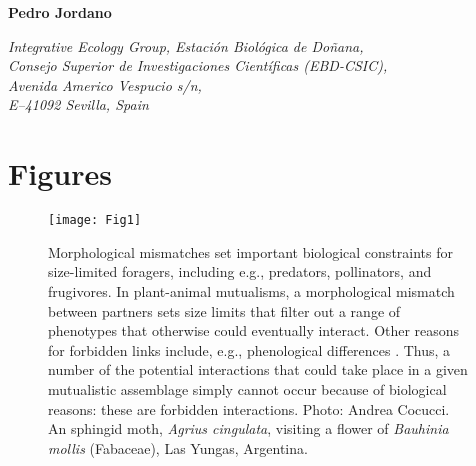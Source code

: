 \documentclass[a4paper,12pt]{article}
\begin{document}
\begin{flushright}
  \noindent 
  		\textbf{Pedro Jordano }\\
  		\begin{spacing}{1.0}
		\textit{Integrative Ecology Group, Estaci\'on Biol\'ogica de Do\~nana, \\ Consejo Superior de Investigaciones Cient\'ificas (EBD-CSIC), \\ Avenida Americo Vespucio s\slash n, \\ E--41092 Sevilla, Spain}
		\end{spacing}
\end{flushright}
\newpage

\section*{Figures}


\begin{figure}[h!]
  \caption{Morphological mismatches set important biological constraints for size-limited foragers, including e.g., predators, pollinators, and frugivores. In plant-animal mutualisms, a morphological mismatch between partners sets size limits that filter out a range of phenotypes that otherwise could eventually interact. Other reasons for forbidden links include, e.g., phenological differences \citep{BasJor:2014}. Thus, a number of the potential interactions that could take place in a given mutualistic assemblage simply cannot occur because of biological reasons: these are forbidden interactions. Photo: Andrea Cocucci. An sphingid moth, \textit{Agrius cingulata}, visiting a flower of \textit{Bauhinia mollis} (Fabaceae), Las Yungas, Argentina.}
  \label{Fig1}
  \begin{center}
    \texttt{[image: Fig1]}
  \end{center}
\end{figure}
\begin{comment}
\bibitem{Borrell:2005}
Borrell, B. (2005) Long tongues and loose niches: Evolution of euglossine bees and their nectar flowers. Biotropica, 37, 664–669.

\bibitem{More:2012}
Mor\'e, M., Amorim, F.W., Benitez-Vieyra, S., Medina, A.M., Sazima, M. \& Cocucci, A.A. (2012) Armament imbalances: match and mismatch in plant-pollinator traits of highly specialized long-spurred orchids. PLoS ONE, 7, e41878. 


\end{comment}
\end{document}
